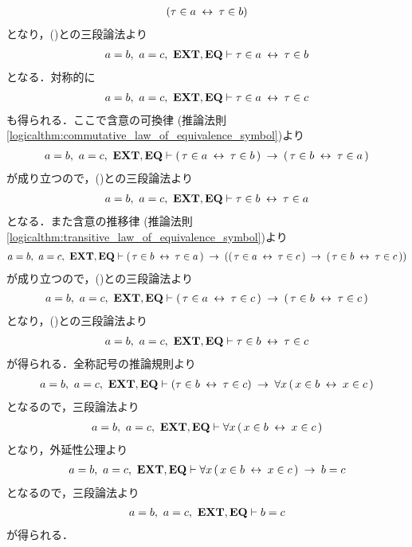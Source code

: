 \begin{sketch}
\begin{align}
			(\tau \in a \hspace{0.25em}\leftrightarrow\hspace{0.25em} \tau \in b)
		\end{align}
		となり，()との三段論法より
		\begin{align}
			a = b,\ a = c,\ \EXTAX,\EQAX \vdash \tau \in a \lrarrow \tau \in b
			\label{fom:thm_transitive_law_of_equality_1}
		\end{align}
		となる．対称的に
		\begin{align}
			a = b,\ a = c,\ \EXTAX,\EQAX \vdash \tau \in a \lrarrow \tau \in c
			\label{fom:thm_transitive_law_of_equality_3}
		\end{align}
		も得られる．ここで含意の可換律
		(推論法則\ref{logicalthm:commutative_law_of_equivalence_symbol})より
		\begin{align}
			a = b,\ a = c,\ \mbox{{\bf EXT}},\mbox{{\bf EQ}} \vdash (\, \tau \in a \hspace{0.25em}\leftrightarrow\hspace{0.25em} \tau \in b\, )
			\hspace{0.25em}\rightarrow\hspace{0.25em} (\, \tau \in b \hspace{0.25em}\leftrightarrow\hspace{0.25em} \tau \in a\, ) 
		\end{align}
		が成り立つので，()との三段論法より
		\begin{align}
			a = b,\ a = c,\ \EXTAX,\EQAX \vdash \tau \in b \lrarrow \tau \in a
			\label{fom:thm_transitive_law_of_equality_2}
		\end{align}
		となる．また含意の推移律
		(推論法則\ref{logicalthm:transitive_law_of_equivalence_symbol})より
		\begin{align}
			a = b,\ a = c,\ \mbox{{\bf EXT}},\mbox{{\bf EQ}} \vdash (\, \tau \in b \hspace{0.25em}\leftrightarrow\hspace{0.25em} \tau \in a\, )
			\hspace{0.25em}\rightarrow\hspace{0.25em} ((\, \tau \in a \hspace{0.25em}\leftrightarrow\hspace{0.25em} \tau \in c\, )
			\hspace{0.25em}\rightarrow\hspace{0.25em} (\, \tau \in b \hspace{0.25em}\leftrightarrow\hspace{0.25em} \tau \in c\, )) 
		\end{align}
		が成り立つので，()との三段論法より
		\begin{align}
			a = b,\ a = c,\ \mbox{{\bf EXT}},\mbox{{\bf EQ}} \vdash (\, \tau \in a \hspace{0.25em}\leftrightarrow\hspace{0.25em} \tau \in c\, )
			\hspace{0.25em}\rightarrow\hspace{0.25em} (\, \tau \in b \hspace{0.25em}\leftrightarrow\hspace{0.25em} \tau \in c\, )
		\end{align}
		となり，()との三段論法より
		\begin{align}
			a = b,\ a = c,\ \mbox{{\bf EXT}},\mbox{{\bf EQ}} \vdash \tau \in b \hspace{0.25em}\leftrightarrow\hspace{0.25em} \tau \in c
		\end{align}
		が得られる．全称記号の推論規則より
		\begin{align}
			a = b,\ a = c,\ \mbox{{\bf EXT}},\mbox{{\bf EQ}} \vdash (\tau \in b \hspace{0.25em}\leftrightarrow\hspace{0.25em} \tau \in c)
			\hspace{0.25em}\rightarrow\hspace{0.25em} \forall x\, (\, x \in b \hspace{0.25em}\leftrightarrow\hspace{0.25em} x \in c\, )
		\end{align}
		となるので，三段論法より
		\begin{align}
			a = b,\ a = c,\ \mbox{{\bf EXT}},\mbox{{\bf EQ}} \vdash \forall x\, (\, x \in b \hspace{0.25em}\leftrightarrow\hspace{0.25em} x \in c\, )
		\end{align}
		となり，外延性公理より
		\begin{align}
			a = b,\ a = c,\ \mbox{{\bf EXT}},\mbox{{\bf EQ}} \vdash \forall x\, (\, x \in b \hspace{0.25em}\leftrightarrow\hspace{0.25em} x \in c\, )
			\hspace{0.25em}\rightarrow\hspace{0.25em} b = c
		\end{align}
		となるので，三段論法より
		\begin{align}
			a = b,\ a = c,\ \mbox{{\bf EXT}},\mbox{{\bf EQ}} \vdash b = c
		\end{align}
		が得られる．
		\QED
	\end{sketch}
	
